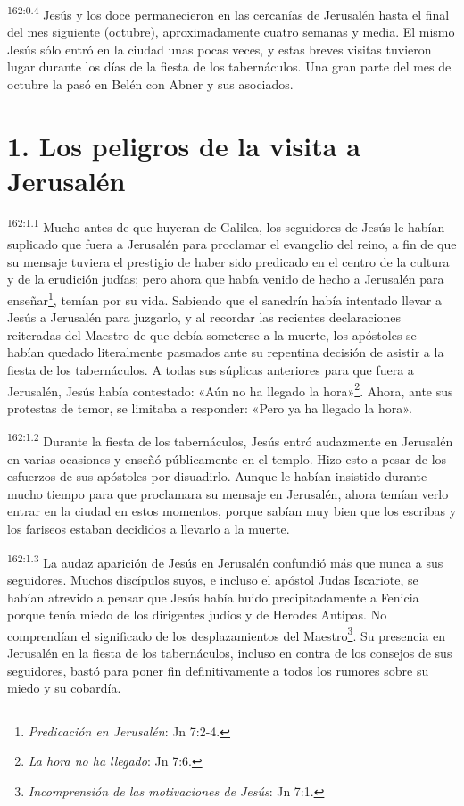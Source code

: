 \par
\textsuperscript{162:0.4} Jesús y los doce permanecieron en las cercanías de Jerusalén hasta el final del mes siguiente (octubre), aproximadamente cuatro semanas y media. El mismo Jesús sólo entró en la ciudad unas pocas veces, y estas breves visitas tuvieron lugar durante los días de la fiesta de los tabernáculos. Una gran parte del mes de octubre la pasó en Belén con Abner y sus asociados.

\section*{1. Los peligros de la visita a Jerusalén}
\par
\textsuperscript{162:1.1} Mucho antes de que huyeran de Galilea, los seguidores de Jesús le habían suplicado que fuera a Jerusalén para proclamar el evangelio del reino, a fin de que su mensaje tuviera el prestigio de haber sido predicado en el centro de la cultura y de la erudición judías; pero ahora que había venido de hecho a Jerusalén para enseñar\footnote{\textit{Predicación en Jerusalén}: Jn 7:2-4.}, temían por su vida. Sabiendo que el sanedrín había intentado llevar a Jesús a Jerusalén para juzgarlo, y al recordar las recientes declaraciones reiteradas del Maestro de que debía someterse a la muerte, los apóstoles se habían quedado literalmente pasmados ante su repentina decisión de asistir a la fiesta de los tabernáculos. A todas sus súplicas anteriores para que fuera a Jerusalén, Jesús había contestado: «Aún no ha llegado la hora»\footnote{\textit{La hora no ha llegado}: Jn 7:6.}. Ahora, ante sus protestas de temor, se limitaba a responder: «Pero ya ha llegado la hora».

\par
\textsuperscript{162:1.2} Durante la fiesta de los tabernáculos, Jesús entró audazmente en Jerusalén en varias ocasiones y enseñó públicamente en el templo. Hizo esto a pesar de los esfuerzos de sus apóstoles por disuadirlo. Aunque le habían insistido durante mucho tiempo para que proclamara su mensaje en Jerusalén, ahora temían verlo entrar en la ciudad en estos momentos, porque sabían muy bien que los escribas y los fariseos estaban decididos a llevarlo a la muerte.

\par
\textsuperscript{162:1.3} La audaz aparición de Jesús en Jerusalén confundió más que nunca a sus seguidores. Muchos discípulos suyos, e incluso el apóstol Judas Iscariote, se habían atrevido a pensar que Jesús había huido precipitadamente a Fenicia porque tenía miedo de los dirigentes judíos y de Herodes Antipas. No comprendían el significado de los desplazamientos del Maestro\footnote{\textit{Incomprensión de las motivaciones de Jesús}: Jn 7:1.}. Su presencia en Jerusalén en la fiesta de los tabernáculos, incluso en contra de los consejos de sus seguidores, bastó para poner fin definitivamente a todos los rumores sobre su miedo y su cobardía.

